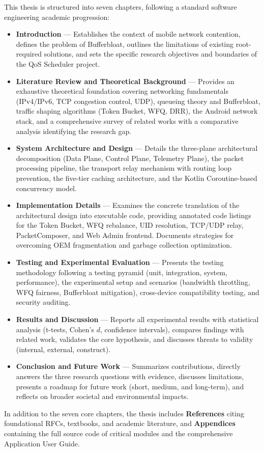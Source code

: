 This thesis is structured into seven chapters, following a standard software engineering academic progression:

\begin{itemize}
    \item[\textbf{Chapter 1:}] \textbf{Introduction} --- Establishes the context of mobile network contention, defines the problem of Bufferbloat, outlines the limitations of existing root-required solutions, and sets the specific research objectives and boundaries of the QoS Scheduler project.
    
    \item[\textbf{Chapter 2:}] \textbf{Literature Review and Theoretical Background} --- Provides an exhaustive theoretical foundation covering networking fundamentals (IPv4/IPv6, TCP congestion control, UDP), queueing theory and Bufferbloat, traffic shaping algorithms (Token Bucket, WFQ, DRR), the Android network stack, and a comprehensive survey of related works with a comparative analysis identifying the research gap.
    
    \item[\textbf{Chapter 3:}] \textbf{System Architecture and Design} --- Details the three-plane architectural decomposition (Data Plane, Control Plane, Telemetry Plane), the packet processing pipeline, the transport relay mechanism with routing loop prevention, the five-tier caching architecture, and the Kotlin Coroutine-based concurrency model.
    
    \item[\textbf{Chapter 4:}] \textbf{Implementation Details} --- Examines the concrete translation of the architectural design into executable code, providing annotated code listings for the Token Bucket, WFQ rebalance, UID resolution, TCP/UDP relay, PacketComposer, and Web Admin frontend. Documents strategies for overcoming OEM fragmentation and garbage collection optimization.
    
    \item[\textbf{Chapter 5:}] \textbf{Testing and Experimental Evaluation} --- Presents the testing methodology following a testing pyramid (unit, integration, system, performance), the experimental setup and scenarios (bandwidth throttling, WFQ fairness, Bufferbloat mitigation), cross-device compatibility testing, and security auditing.
    
    \item[\textbf{Chapter 6:}] \textbf{Results and Discussion} --- Reports all experimental results with statistical analysis (t-tests, Cohen's $d$, confidence intervals), compares findings with related work, validates the core hypothesis, and discusses threats to validity (internal, external, construct).
    
    \item[\textbf{Chapter 7:}] \textbf{Conclusion and Future Work} --- Summarizes contributions, directly answers the three research questions with evidence, discusses limitations, presents a roadmap for future work (short, medium, and long-term), and reflects on broader societal and environmental impacts.
\end{itemize}

\noindent In addition to the seven core chapters, the thesis includes \textbf{References} citing foundational RFCs, textbooks, and academic literature, and \textbf{Appendices} containing the full source code of critical modules and the comprehensive Application User Guide.

